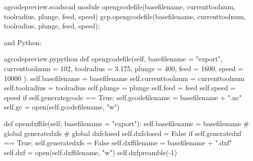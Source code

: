 \documentclass{ltxdoc}
\begin{document}
 
\lstset{firstnumber=\thegcpscad}
\begin{writecode}{a}{gcodepreview.scad}{scad}
module opengcodefile(basefilename, currenttoolnum, toolradius, plunge, feed, speed) {
    gcp.opengcodefile(basefilename, currenttoolnum, toolradius, plunge, feed, speed);
}

\end{writecode}
\addtocounter{gcpscad}{4}

\noindent and Python:

\lstset{firstnumber=\thegcpy}
\begin{writecode}{a}{gcodepreview.py}{python}
    def opengcodefile(self, basefilename = "export",
                      currenttoolnum = 102,
                      toolradius = 3.175,
                      plunge = 400,
                      feed = 1600,
                      speed = 10000
                      ):
        self.basefilename = basefilename
        self.currenttoolnum = currenttoolnum
        self.toolradius = toolradius
        self.plunge = plunge
        self.feed = feed
        self.speed = speed
        if self.generategcode == True:
            self.gcodefilename = basefilename + ".nc"
            self.gc = open(self.gcodefilename, "w")

    def opendxffile(self, basefilename = "export"): 
        self.basefilename = basefilename
#        global generatedxfs
#        global dxfclosed
        self.dxfclosed = False
        if self.generatedxf == True:
            self.generatedxfs = False
            self.dxffilename = basefilename + ".dxf"
            self.dxf = open(self.dxffilename, "w")
            self.dxfpreamble(-1)


\end{writecode}
\end{document}
